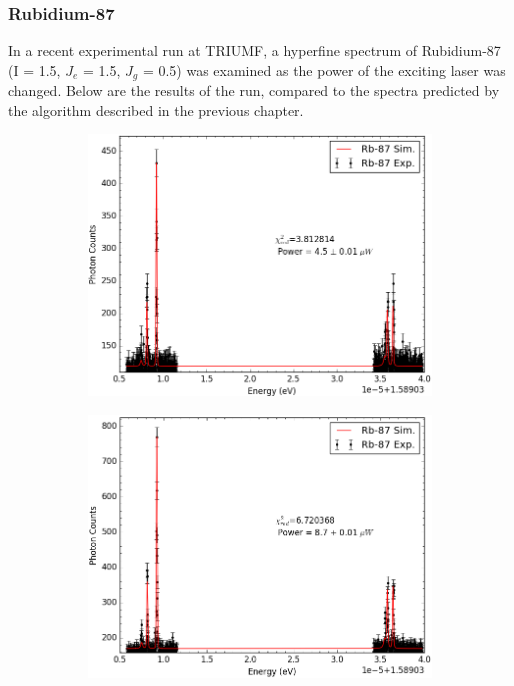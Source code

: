 \pagebreak
\subsubsection{Rubidium-87}
In a recent experimental run at TRIUMF, a hyperfine spectrum of Rubidium-87 (I = 1.5, $J_e$ = 1.5, $J_g$ = 0.5) was examined as the power of the exciting laser was changed. Below are the results of the run, compared to the spectra predicted by the algorithm described in the previous chapter.

\begin{figure}[h]
    \centering
    \begin{subfigure}[b]{0.49\textwidth}
        \includegraphics[width=\textwidth]{Graphics/100_101.png}
        \caption{}
    \end{subfigure}
    \begin{subfigure}[b]{0.49\textwidth}
        \includegraphics[width=\textwidth]{Graphics/098_099.png}
        \caption{}
        \label{}
    \end{subfigure}
    

\end{figure}
